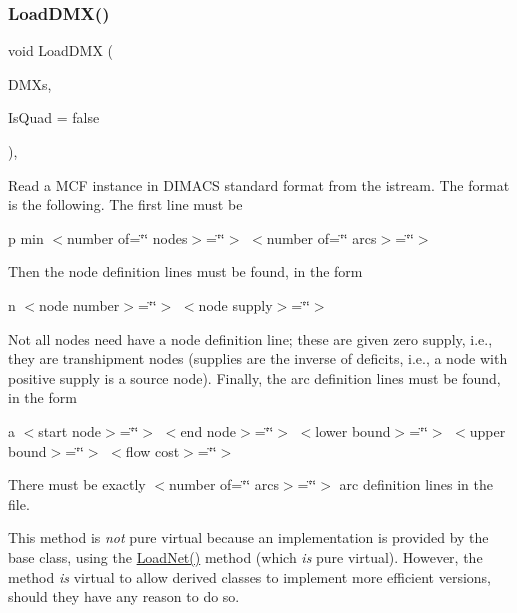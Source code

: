 \subsubsection{\texorpdfstring{Load\+D\+M\+X()}{LoadDMX()}}
{\footnotesize\ttfamily void Load\+D\+MX (\begin{DoxyParamCaption}\item[{istream \&}]{D\+M\+Xs,  }\item[{bool}]{Is\+Quad = {\ttfamily false} }\end{DoxyParamCaption})\hspace{0.3cm}{\ttfamily [inline]}, {\ttfamily [virtual]}}

Read a M\+CF instance in D\+I\+M\+A\+CS standard format from the istream. The format is the following. The first line must be

p min $<$number of=\char`\"{}\char`\"{} nodes$>$=\char`\"{}\char`\"{}$>$ $<$number of=\char`\"{}\char`\"{} arcs$>$=\char`\"{}\char`\"{}$>$

Then the node definition lines must be found, in the form

n $<$node number$>$=\char`\"{}\char`\"{}$>$ $<$node supply$>$=\char`\"{}\char`\"{}$>$

Not all nodes need have a node definition line; these are given zero supply, i.\+e., they are transhipment nodes (supplies are the inverse of deficits, i.\+e., a node with positive supply is a source node). Finally, the arc definition lines must be found, in the form

a $<$start node$>$=\char`\"{}\char`\"{}$>$ $<$end node$>$=\char`\"{}\char`\"{}$>$ $<$lower bound$>$=\char`\"{}\char`\"{}$>$ $<$upper bound$>$=\char`\"{}\char`\"{}$>$ $<$flow cost$>$=\char`\"{}\char`\"{}$>$

There must be exactly $<$number of=\char`\"{}\char`\"{} arcs$>$=\char`\"{}\char`\"{}$>$ arc definition lines in the file.

This method is {\itshape not} pure virtual because an implementation is provided by the base class, using the \mbox{\hyperlink{class_m_c_f_class_a8d82d26f7845eb69081c860e14c3dc4c}{Load\+Net()}} method (which {\itshape is} pure virtual). However, the method {\itshape is} virtual to allow derived classes to implement more efficient versions, should they have any reason to do so.

